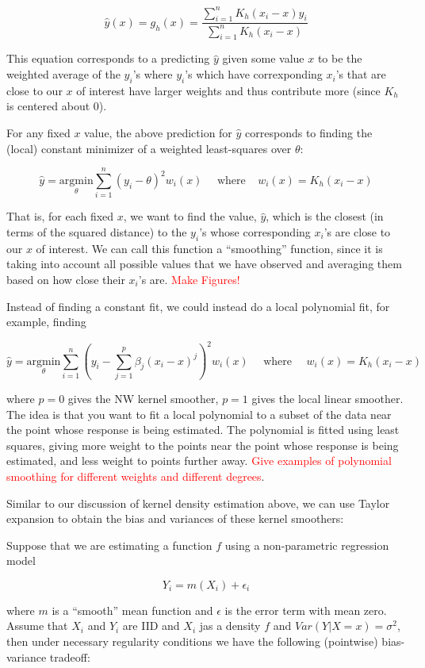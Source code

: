 $$\hat{y}(x) = g_h(x) = \frac{\sum_{i=1}^n K_h(x_i - x) y_i}{\sum_{i=1}^n K_h(x_i - x)}$$

This equation corresponds to a predicting $\hat{y}$ given some value $x$ to be the weighted average of the $y_i$'s where $y_i$'s which have correxponding $x_i$'s that are close to our $x$ of interest have larger weights and thus contribute more (since $K_h$ is centered about $0$). 

For any fixed $x$ value, the above prediction for $\hat{y}$ corresponds to finding the (local) constant minimizer of a weighted least-squares over $\theta$:

$$\hat{y} = \underset{\theta}{\text{argmin}} \sum_{i=1}^n (y_i - \theta)^2 w_i(x) ~~~~~~ \text{where} ~~~~~ w_i(x) = K_h(x_i - x)$$


That is, for each fixed $x$, we want to find the value, $\hat{y}$, which is the closest (in terms of the squared distance) to the $y_i$'s whose corresponding $x_i$'s are close to our $x$ of interest. We can call this function a ``smoothing'' function, since it is taking into account all possible values that we have observed and averaging them based on how close their $x_i$'s are.
\textcolor{red}{Make Figures!}


Instead of finding a constant fit, we could instead do a local polynomial fit, for example, finding


$$\hat{y} = \underset{\theta}{\text{argmin}} \sum_{i=1}^n \left(y_i - \sum_{j=1}^p \beta_j(x_i - x)^j\right)^2 w_i(x) ~~~~~~ \text{where} ~~~~~~ w_i(x) = K_h(x_i - x)$$

where $p=0$ gives the NW kernel smoother, $p=1$ gives the local linear smoother. The idea is that you want to fit a local polynomial to a subset of the data near the point whose response is being estimated. The polynomial is fitted using least squares, giving more weight to the points near the point whose response is being estimated, and less weight to points further away. \textcolor{red}{Give examples of polynomial smoothing for different weights and different degrees}. 


Similar to our discussion of kernel density estimation above, we can use Taylor expansion to obtain the bias and variances of these kernel smoothers:


Suppose that we are estimating a function $f$ using a non-parametric regression model

$$Y_i = m(X_i) + \epsilon_i$$

where $m$ is a ``smooth'' mean function and $\epsilon$ is the error term with mean zero. Assume that $X_i$ and $Y_i$ are IID and $X_i$ jas a density $f$ and $Var(Y | X = x) = \sigma^2$, then under necessary regularity conditions we have the following (pointwise) bias-variance tradeoff:

